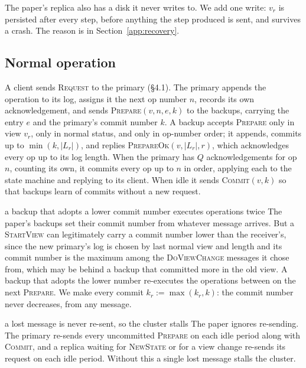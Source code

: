 \documentclass[11pt,a4paper]{article}
\theoremstyle{plain}
\theoremstyle{definition}
\theoremstyle{remark}
\newcommand{\msg}[1]{\textsc{#1}}
\begin{document}
The paper's replica also has a disk it never writes to. We add one
write: $v_r$ is persisted after every step, before anything the step
produced is sent, and survives a crash. The reason is in
Section~\ref{app:recovery}.

\subsection{Normal operation}
\label{app:normal}

A client sends \msg{Request} to the primary (\S4.1). The primary appends
the operation to its log, assigns it the next op number $n$, records its
own acknowledgement, and sends \msg{Prepare}$(v, n, e, k)$ to the backups,
carrying the entry $e$ and the primary's commit number $k$. A backup
accepts \msg{Prepare} only in view $v_r$, only in normal status, and only
in op-number order; it appends, commits up to $\min(k, |L_r|)$, and
replies \msg{PrepareOk}$(v, |L_r|, r)$, which acknowledges every op up to
its log length. When the primary has $Q$ acknowledgements for op $n$,
counting its own, it commits every op up to $n$ in order, applying each to
the state machine and replying to its client. When idle it sends
\msg{Commit}$(v, k)$ so that backups learn of commits without a new
request.

\begin{departure}{a backup that adopts a lower commit number executes operations twice}
The paper's backups
set their commit number from whatever message arrives. But a
\msg{StartView} can legitimately carry a commit number lower than the
receiver's, since the new primary's log is chosen by last normal view and
length and its commit number is the maximum among the \msg{DoViewChange}
messages it chose from, which may be
behind a backup that committed more in the old view. A backup that
adopts the lower number re-executes the operations between on the next
\msg{Prepare}. We make every commit $k_r := \max(k_r, k)$: the commit
number never decreases, from any message.
\end{departure}

\begin{departure}{a lost message is never re-sent, so the cluster stalls}
The paper ignores re-sending. The
primary re-sends every uncommitted \msg{Prepare} on each idle period
along with \msg{Commit}, and a replica waiting for \msg{NewState} or for
a view change re-sends its request on each idle period. Without this a
single lost message stalls the cluster.
\end{departure}
\end{document}
